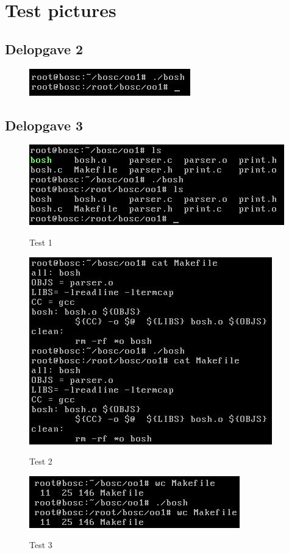 \chapter{Test pictures}
\section{Delopgave 2}
\begin{figure}[h!]
\centering
\includegraphics{Images/TestOfPart2}
\label{Test2}
\end{figure}

\section{Delopgave 3}
\begin{figure}[h!]
\centering
\caption{Test 1}
\includegraphics{Images/TestOfPart3_1}
\label{Test3_1}
\end{figure}

\begin{figure}[h!]
\centering
\caption{Test 2}
\includegraphics{Images/TestOfPart3_2}
\label{Test3_2}
\end{figure}

\begin{figure}[h!]
\centering
\caption{Test 3}
\includegraphics{Images/TestOfPart3_3}
\label{Test3_3}
\end{figure}

